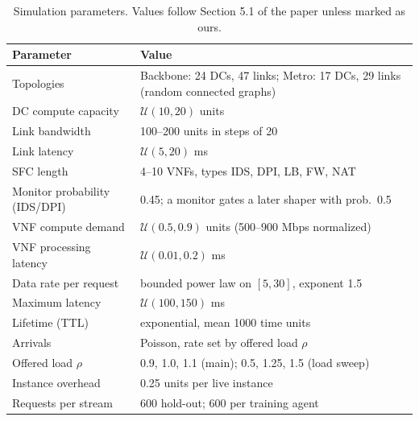 \documentclass[11pt,a4paper]{article}
\newcommand{\ours}[1]{\textcolor[HTML]{1B7F5A}{#1}}
\begin{document}
\begin{table}[H]
\centering\small
\caption{Simulation parameters. Values follow Section 5.1 of the paper unless
marked as ours.}
\label{tab:params}
\begin{tabularx}{\linewidth}{l X}
\toprule
Parameter & Value \\
\midrule
Topologies & Backbone: 24 DCs, 47 links; Metro: 17 DCs, 29 links (random connected graphs) \\
DC compute capacity & $\mathcal{U}(10, 20)$ units \\
Link bandwidth & 100--200 units in steps of 20 \\
Link latency & $\mathcal{U}(5, 20)$ ms \\
SFC length & 4--10 VNFs, types IDS, DPI, LB, FW, NAT \\
Monitor probability (IDS/DPI) & 0.45; a monitor gates a later shaper with prob.\ 0.5 \\
VNF compute demand & $\mathcal{U}(0.5, 0.9)$ units (500--900 Mbps normalized) \\
VNF processing latency & $\mathcal{U}(0.01, 0.2)$ ms \\
Data rate per request & bounded power law on $[5, 30]$, exponent 1.5 \\
Maximum latency & $\mathcal{U}(100, 150)$ ms \\
Lifetime (TTL) & exponential, mean 1000 time units \\
Arrivals & \ours{Poisson, rate set by offered load $\rho$} \\
Offered load $\rho$ & \ours{0.9, 1.0, 1.1 (main); 0.5, 1.25, 1.5 (load sweep)} \\
Instance overhead & \ours{0.25 units per live instance} \\
Requests per stream & \ours{600 hold-out; 600 per training agent} \\
\bottomrule
\end{tabularx}
\end{table}
\end{document}
